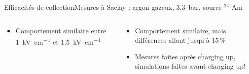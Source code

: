 \begin{frame}{Efficacités de collection}{Mesures à Saclay : argon gazeux, \SI{3.3}{\bar}, source $^{241}$Am}
\begin{scriptsize}
\begin{columns}
\begin{column}{0.5\textwidth}
            \end{column}
        \end{columns}
      		\begin{columns}
            \begin{column}{0.5\textwidth}
                \begin{itemize}
                    \item Comportement similaire entre \SI{1}{\kilo\volt\per\centi\meter} et \SI{1.5}{\kilo\volt\per\centi\meter}
                \end{itemize}
            \end{column}\hfill
            \begin{column}{0.5\textwidth}
                \begin{itemize}
                    \item Comportement similaire, mais différences allant jusqu'à 15\,\%
                    \item[\danger] Mesures faites après charging up, simulations faites avant charging up!
                \end{itemize}
            \end{column}
        \end{columns}
        \end{scriptsize}
    \end{frame}

